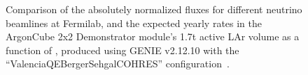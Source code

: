 \begin{figure}[htb]
  \centering
  \caption{Comparison of the absolutely normalized fluxes for different neutrino beamlines at Fermilab, and the expected yearly rates in the ArgonCube 2x2 Demonstrator module's 1.7t active LAr volume as a function of \enu, produced using GENIE v2.12.10 with the ``ValenciaQEBergerSehgalCOHRES'' configuration~\cite{genie}.}
  \label{fig:beam_options}
\end{figure}
